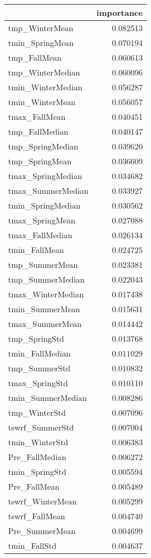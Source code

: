 \begin{tabular}{lr}
\toprule
 & importance \\
\midrule
tmp_WinterMean & 0.082513 \\
tmin_SpringMean & 0.070194 \\
tmp_FallMean & 0.060613 \\
tmp_WinterMedian & 0.060096 \\
tmin_WinterMedian & 0.056287 \\
tmin_WinterMean & 0.056057 \\
tmax_FallMean & 0.040451 \\
tmp_FallMedian & 0.040147 \\
tmp_SpringMedian & 0.039620 \\
tmp_SpringMean & 0.036609 \\
tmax_SpringMedian & 0.034682 \\
tmax_SummerMedian & 0.033927 \\
tmin_SpringMedian & 0.030562 \\
tmax_SpringMean & 0.027088 \\
tmax_FallMedian & 0.026134 \\
tmin_FallMean & 0.024725 \\
tmp_SummerMean & 0.023381 \\
tmp_SummerMedian & 0.022043 \\
tmax_WinterMedian & 0.017438 \\
tmin_SummerMean & 0.015631 \\
tmax_SummerMean & 0.014442 \\
tmp_SpringStd & 0.013768 \\
tmin_FallMedian & 0.011029 \\
tmp_SummerStd & 0.010832 \\
tmax_SpringStd & 0.010110 \\
tmin_SummerMedian & 0.008286 \\
tmp_WinterStd & 0.007096 \\
tswrf_SummerStd & 0.007004 \\
tmin_WinterStd & 0.006383 \\
Pre_FallMedian & 0.006272 \\
tmin_SpringStd & 0.005594 \\
Pre_FallMean & 0.005489 \\
tswrf_WinterMean & 0.005299 \\
tswrf_FallMean & 0.004740 \\
Pre_SummerMean & 0.004699 \\
tmin_FallStd & 0.004637 \\

\end{tabular}
